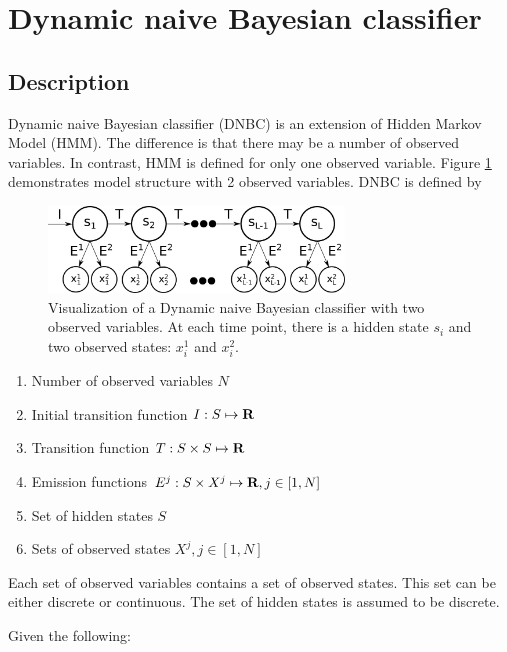 \documentclass[thesis=B,english]{FITthesis}[2012/06/26]
\begin{document}
\section{Dynamic naive Bayesian classifier}

\subsection{Description}

Dynamic naive Bayesian classifier (DNBC) is an extension of Hidden Markov Model (HMM). The difference is that there may be a number of observed variables. In contrast, HMM is defined for only one observed variable. Figure \ref{fig:dnbc} demonstrates model structure with 2 observed variables. DNBC is defined by

\begin{figure}
	\centering
 	\includegraphics[width=0.7\textwidth]{dnbc}
 	\caption{Visualization of a Dynamic naive Bayesian classifier with two observed variables. At each time point, there is a hidden state $s_i$ and two observed states: $x_i^1$ and $x_i^2$.}
 	\label{fig:dnbc}
\end{figure}

\begin{enumerate}

\item{Number of observed variables $N$}
\item{Initial transition function $I: S \mapsto \textbf R$}
\item{Transition function $T: S \times S \mapsto \textbf R$}
\item{Emission functions $E^j: S \times X^j \mapsto \textbf R, j \in [1,N]$}
\item{Set of hidden states $S$}
\item{Sets of observed states $X^j, j \in [1,N]$}

\end{enumerate}

Each set of observed variables contains a set of observed states. This set can be either discrete or continuous. The set of hidden states is assumed to be discrete.

Given the following:
\end{document}
